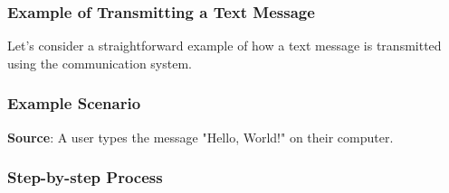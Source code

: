 \documentclass[12pt, oneside]{book}
\begin{document}
\subsubsection*{Example of Transmitting a Text Message}

Let's consider a straightforward example of how a text message is transmitted using the communication system.

\subsubsection*{Example Scenario}
\textbf{Source}: A user types the message "Hello, World!" on their computer.

\subsubsection*{Step-by-step Process}
\end{document}
